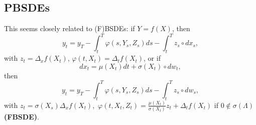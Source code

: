 \subsection{PBSDEs}
This seems closely related to (F)BSDEs: if $Y=f(X)$, then 
$$y_t = y_T - \int_t^T \varphi(s, Y_s, Z_s)ds -  \int_t^T z_s \circ dx_s, $$
with $z_t = \Delta_x f(X_t)$, $\varphi(t,X_t) = \Delta_t f(X_t)$, or if 
$$dx_t = \mu(X_t)dt + \sigma(X_t) \circ dw_t, $$
then
$$y_t = y_T - \int_t^T \varphi(s,Y_s,Z_s)ds -  \int_t^T z_s \circ dw_s, $$
with $z_t = \sigma(X_s) \Delta_x f(X_t) $,\,  $\varphi(t,X_t,Z_t) = \frac{\mu(X_t)}{\sigma(X_t)} z_t + \Delta_t f(X_t)$ if $0 \notin \sigma(\Lambda) $  \textbf{(FBSDE)}.

